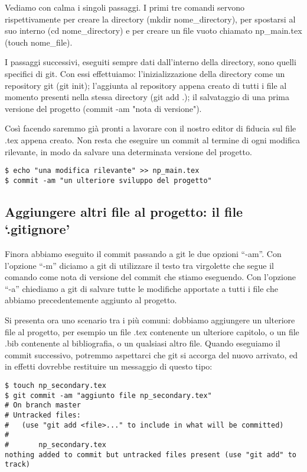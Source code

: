 \documentclass[a4paper,12pt,oneside]{article}
\begin{document}
Vediamo con calma i singoli passaggi. I primi tre comandi servono
rispettivamente per creare la directory (mkdir nome\_directory), per spostarsi
al suo interno (cd nome\_directory) e per creare un file vuoto chiamato
np\_main.tex (touch nome\_file).

I passaggi successivi, eseguiti sempre dati dall'interno della directory, sono
quelli specifici di git. Con essi effettuiamo:
l'inizializzazione della directory come un repository git (git init); l'aggiunta
al repository appena creato di tutti i file al momento presenti nella stessa
directory (git add .); il salvataggio di una prima versione del progetto (commit
-am "nota di versione").

Così facendo saremmo già pronti a lavorare con il nostro editor di fiducia sul
file .tex appena creato.
Non resta che eseguire un commit al termine di ogni modifica rilevante, in
modo da salvare una determinata versione del progetto.

\begin{lstlisting}
$ echo "una modifica rilevante" >> np_main.tex
$ commit -am "un ulteriore sviluppo del progetto"
\end{lstlisting}

\subsection{Aggiungere altri file al progetto: il file `.gitignore'}
Finora abbiamo eseguito il commit passando a git le due opzioni ``-am''. Con
l'opzione ``-m'' diciamo a git di utilizzare il testo tra virgolette che segue
il comando come nota di versione del commit che stiamo eseguendo. Con l'opzione
``-a'' chiediamo a git di salvare tutte le modifiche apportate a tutti i file
che abbiamo precedentemente aggiunto al progetto.

Si presenta ora uno scenario tra i più comuni: dobbiamo aggiungere un ulteriore
file al progetto, per esempio un file .tex contenente un ulteriore capitolo, o
un file .bib contenente al bibliografia, o un qualsiasi altro file.
Quando eseguiamo il commit successivo, potremmo aspettarci che git si accorga
del nuovo arrivato, ed in effetti dovrebbe restituire un messaggio di questo
tipo:

\begin{lstlisting}
$ touch np_secondary.tex
$ git commit -am "aggiunto file np_secondary.tex"
# On branch master
# Untracked files:
#   (use "git add <file>..." to include in what will be committed)
#
#       np_secondary.tex
nothing added to commit but untracked files present (use "git add" to track)
\end{lstlisting}
\end{document}
